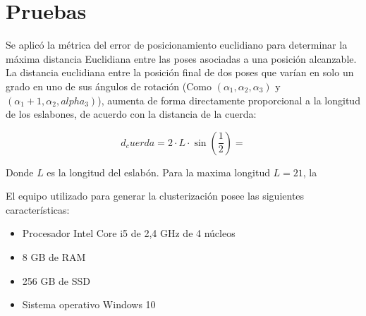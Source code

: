 \section{Pruebas}

Se aplicó la métrica del error de posicionamiento euclidiano para determinar la máxima distancia Euclidiana entre las poses asociadas a una posición alcanzable. La distancia euclidiana entre la posición final de dos poses que varían en solo un grado en uno de sus ángulos de rotación (Como $(\alpha_1,\alpha_2,\alpha_3)$ y $(\alpha_1 + 1, \alpha_2, alpha_3)$), aumenta de forma directamente proporcional a la longitud de los eslabones, de acuerdo con la distancia de la cuerda:

\begin{equation}
	d_cuerda = 2 \cdot L \cdot \sin(\frac{1}{2}) =  
\end{equation}

Donde $L$ es la longitud del eslabón. Para la maxima longitud $L = 21$, la 

El equipo utilizado para generar la clusterización posee las siguientes características:

\begin{itemize}
	\item Procesador Intel Core i5 de 2,4 GHz de 4 núcleos
	\item 8 GB de RAM
	\item 256 GB de SSD
	\item Sistema operativo Windows 10
\end{itemize}

